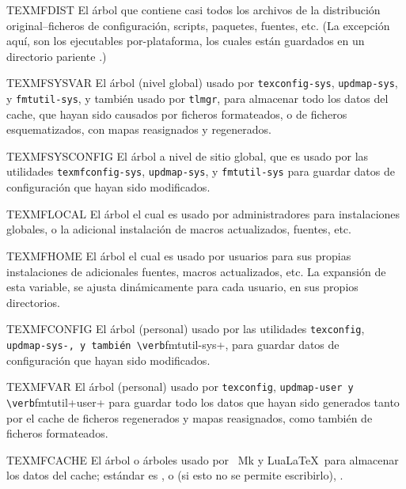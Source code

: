 \documentclass{article}
\begin{document}
\begin{ttdescription}
\item [TEXMFDIST] El árbol que contiene casi todos los
	archivos de la distribución original--ficheros de configuración, scripts, paquetes, fuentes, etc. (La excepción aquí, son los ejecutables por-plataforma, los cuales están guardados en un directorio pariente .)
\item [TEXMFSYSVAR] El árbol (nivel global) usado por \verb+texconfig-sys+, \verb+updmap-sys+, y \verb+fmtutil-sys+, y también usado por \verb+tlmgr+, para almacenar todo los datos del cache, que hayan sido causados por ficheros formateados, o de ficheros esquematizados, con mapas reasignados y regenerados.
\item [TEXMFSYSCONFIG] El árbol a nivel de sitio global, que es usado por las utilidades \verb+texmfconfig-sys+, \verb+updmap-sys+, y \verb+fmtutil-sys+ para guardar datos de configuración que hayan sido modificados.
\item [TEXMFLOCAL] El árbol el cual es usado por administradores para instalaciones globales, o la adicional instalación de macros actualizados, fuentes, etc.
\item [TEXMFHOME] El árbol el cual es usado por usuarios para sus propias instalaciones de adicionales fuentes, macros actualizados, etc. La expansión de esta variable, se ajusta dinámicamente para cada usuario, en sus propios directorios.
\item [TEXMFCONFIG] El árbol (personal) usado por las utilidades \verb+texconfig+, \verb+updmap-sys-, y también \verb+fmtutil-sys+, para guardar datos de configuración que hayan sido modificados.  
\item [TEXMFVAR] El árbol (personal) usado por \verb+texconfig+, \verb+updmap-user y \verb+fmtutil+user+ para guardar todo los datos que hayan sido generados tanto por el cache de ficheros regenerados y mapas reasignados, como también de ficheros formateados.
\item [TEXMFCACHE] El árbol o árboles usado por \ConTeXt\ Mk y Lua\LaTeX\ para almacenar los datos del cache; estándar es , o (si esto no se permite escribirlo), .
\end{ttdescription}
\end{document}
